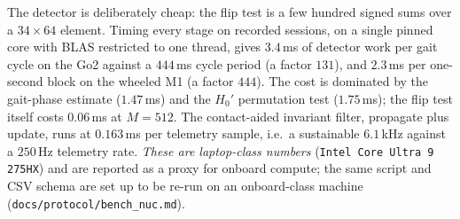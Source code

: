 The detector is deliberately cheap: the flip test is a few hundred signed sums over a $34\times64$ element. Timing every
stage on recorded sessions, on a single pinned core with BLAS restricted to one thread, gives $3.4$\,ms of detector work
per gait cycle on the Go2 against a $444$\,ms cycle period (a factor $131$), and $2.3$\,ms per one-second block on the
wheeled M1 (a factor $444$). The cost is dominated by the gait-phase estimate ($1.47$\,ms) and the $H_0'$ permutation
test ($1.75$\,ms); the flip test itself costs $0.06$\,ms at $M=512$. The contact-aided invariant filter, propagate plus
update, runs at $0.163$\,ms per telemetry sample, i.e.\ a sustainable $6.1$\,kHz against a $250$\,Hz telemetry rate.
\emph{These are laptop-class numbers} (\texttt{Intel Core Ultra 9 275HX}) and are reported as a proxy for onboard
compute; the same script and CSV schema are set up to be re-run on an onboard-class machine
(\texttt{docs/protocol/bench\_nuc.md}).
